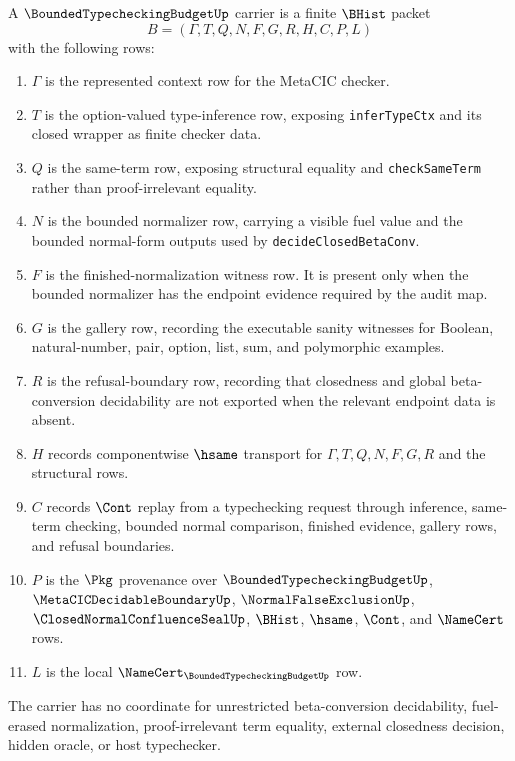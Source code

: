 \begin{definition}
\label{def:bounded-typechecking-budget-carrier}
A $\BoundedTypecheckingBudgetUp$ carrier is a finite $\BHist$ packet
$$
B=(\Gamma,T,Q,N,F,G,R,H,C,P,L)
$$
with the following rows:
\begin{enumerate}
\item $\Gamma$ is the represented context row for the MetaCIC checker.
\item $T$ is the option-valued type-inference row, exposing \texttt{inferTypeCtx} and its closed wrapper as finite checker data.
\item $Q$ is the same-term row, exposing structural equality and \texttt{checkSameTerm} rather than proof-irrelevant equality.
\item $N$ is the bounded normalizer row, carrying a visible fuel value and the bounded normal-form outputs used by \texttt{decideClosedBetaConv}.
\item $F$ is the finished-normalization witness row. It is present only when the bounded normalizer has the endpoint evidence required by the audit map.
\item $G$ is the gallery row, recording the executable sanity witnesses for Boolean, natural-number, pair, option, list, sum, and polymorphic examples.
\item $R$ is the refusal-boundary row, recording that closedness and global beta-conversion decidability are not exported when the relevant endpoint data is absent.
\item $H$ records componentwise $\hsame$ transport for $\Gamma,T,Q,N,F,G,R$ and the structural rows.
\item $C$ records $\Cont$ replay from a typechecking request through inference, same-term checking, bounded normal comparison, finished evidence, gallery rows, and refusal boundaries.
\item $P$ is the $\Pkg$ provenance over $\BoundedTypecheckingBudgetUp$, $\MetaCICDecidableBoundaryUp$, $\NormalFalseExclusionUp$, $\ClosedNormalConfluenceSealUp$, $\BHist$, $\hsame$, $\Cont$, and $\NameCert$ rows.
\item $L$ is the local $\NameCert_{\BoundedTypecheckingBudgetUp}$ row.
\end{enumerate}
The carrier has no coordinate for unrestricted beta-conversion decidability, fuel-erased normalization, proof-irrelevant term equality, external closedness decision, hidden oracle, or host typechecker.
\end{definition}

